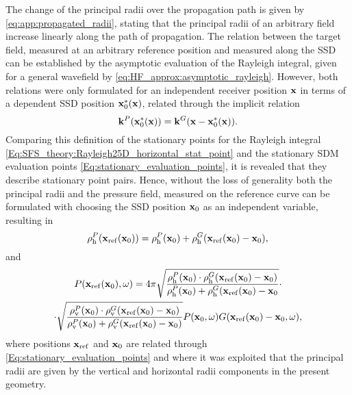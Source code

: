 The change of the principal radii over the propagation path is given by \eqref{eq:app:propagated_radii}, stating that the principal radii of an arbitrary field increase linearly along the path of propagation.
The relation between the target field, measured at an arbitrary reference position and measured along the SSD can be established by the asymptotic evaluation of the Rayleigh integral, given for a general wavefield by \eqref{eq:HF_approx:asymptotic_rayleigh}.
However, both relations were only formulated for an independent receiver position $\mathbf{x}$ in terms of a dependent SSD position $\mathbf{x}_0^*(\mathbf{x})$, related through the implicit relation
\begin{equation}
\label{Eq:SFS_theory:Rayleigh25D_horizontal_stat_point}
\mathbf{k}^P(\mathbf{x}_0^*(\mathbf{x})) = \mathbf{k}^G( \mathbf{x} - \mathbf{x}_0^*(\mathbf{x})).
\end{equation}
Comparing this definition of the stationary points for the Rayleigh integral \eqref{Eq:SFS_theory:Rayleigh25D_horizontal_stat_point} and the stationary SDM evaluation points \eqref{Eq:stationary_evaluation_points}, it is revealed that they describe stationary point pairs.
Hence, without the loss of generality both the principal radii and the pressure field, measured on the reference curve can be formulated with choosing the SSD position $\mathbf{x}_0$ as an independent variable, resulting in
\begin{equation}
\label{Eq:principal_radii_addition}
\rho_\mathrm{h}^P(\mathbf{x}_{\mathrm{ref}}(\mathbf{x}_0)) = \rho_\mathrm{h}^P(\mathbf{x}_0) + \rho_\mathrm{h}^G(\mathbf{x}_{\mathrm{ref}}(\mathbf{x}_0)-\mathbf{x}_0),
\end{equation}
and
\small
\begin{multline}
\label{Eq:Asymptotic_Rayleigh_integral}
P(\mathbf{x}_{\mathrm{ref}}(\mathbf{x}_0),\omega) = 
4\pi
\sqrt{\frac{\rho_\mathrm{h}^P(\mathbf{x}_0) \cdot \rho_\mathrm{h}^G(\mathbf{x}_{\mathrm{ref}}(\mathbf{x}_0)-\mathbf{x}_0)}{\rho_\mathrm{h}^P(\mathbf{x}_0) + \rho_\mathrm{h}^G(\mathbf{x}_{\mathrm{ref}}(\mathbf{x}_0)-\mathbf{x}_0}} \cdot \\ \cdot
\sqrt{\frac{\rho_\mathrm{v}^P(\mathbf{x}_0) \cdot \rho_\mathrm{v}^G(\mathbf{x}_{\mathrm{ref}}(\mathbf{x}_0)-\mathbf{x}_0)}{\rho_\mathrm{v}^P(\mathbf{x}_0) + \rho_\mathrm{v}^G(\mathbf{x}_{\mathrm{ref}}(\mathbf{x}_0)-\mathbf{x}_0)}}
P(\mathbf{x}_0,\omega) G(\mathbf{x}_{\mathrm{ref}}(\mathbf{x}_0)-\mathbf{x}_0,\omega)
,
\end{multline} %
\normalsize
where positions $\mathbf{x}_{\mathrm{ref}}$ and $\mathbf{x}_0$ are related through \eqref{Eq:stationary_evaluation_points} and where it was exploited that the principal radii are given by the vertical and horizontal radii components in the present geometry.

